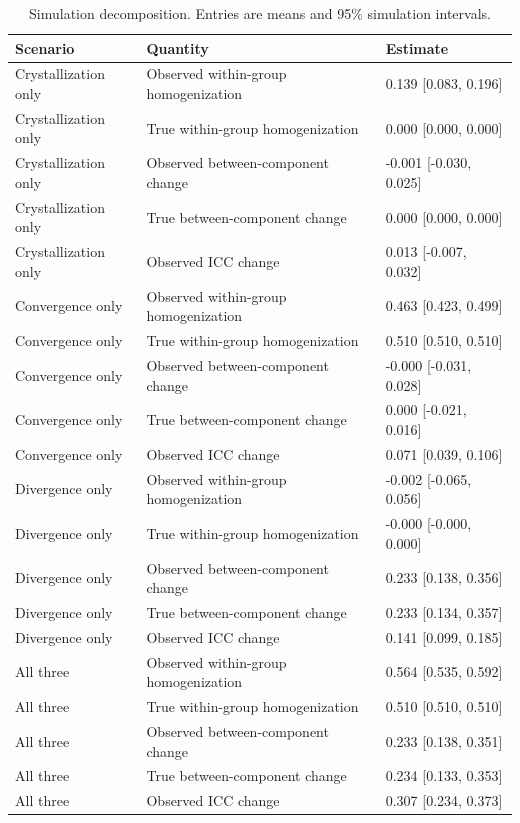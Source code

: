 \begin{table}

\caption{\label{tab:simulation-decomposition}Simulation decomposition. Entries are means and 95\% simulation intervals.}
\centering
\begin{tabular}[t]{lll}
\toprule
Scenario & Quantity & Estimate\\
\midrule
Crystallization only & Observed within-group homogenization & 0.139 [0.083, 0.196]\\
Crystallization only & True within-group homogenization & 0.000 [0.000, 0.000]\\
Crystallization only & Observed between-component change & -0.001 [-0.030, 0.025]\\
Crystallization only & True between-component change & 0.000 [0.000, 0.000]\\
Crystallization only & Observed ICC change & 0.013 [-0.007, 0.032]\\
Convergence only & Observed within-group homogenization & 0.463 [0.423, 0.499]\\
Convergence only & True within-group homogenization & 0.510 [0.510, 0.510]\\
Convergence only & Observed between-component change & -0.000 [-0.031, 0.028]\\
Convergence only & True between-component change & 0.000 [-0.021, 0.016]\\
Convergence only & Observed ICC change & 0.071 [0.039, 0.106]\\
Divergence only & Observed within-group homogenization & -0.002 [-0.065, 0.056]\\
Divergence only & True within-group homogenization & -0.000 [-0.000, 0.000]\\
Divergence only & Observed between-component change & 0.233 [0.138, 0.356]\\
Divergence only & True between-component change & 0.233 [0.134, 0.357]\\
Divergence only & Observed ICC change & 0.141 [0.099, 0.185]\\
All three & Observed within-group homogenization & 0.564 [0.535, 0.592]\\
All three & True within-group homogenization & 0.510 [0.510, 0.510]\\
All three & Observed between-component change & 0.233 [0.138, 0.351]\\
All three & True between-component change & 0.234 [0.133, 0.353]\\
All three & Observed ICC change & 0.307 [0.234, 0.373]\\
\bottomrule
\end{tabular}
\end{table}
